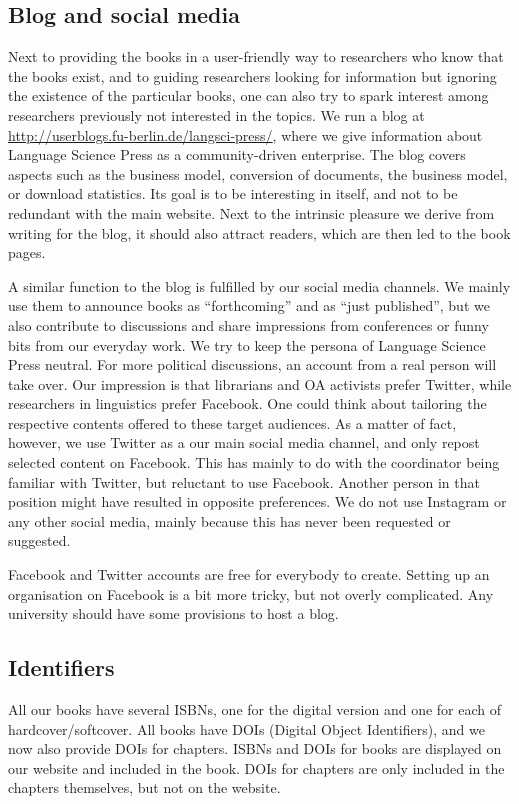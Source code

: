 \documentclass[output=guidelines,guidelines] {langscibook}
\begin{document}
\subsection{Blog and social media}
Next to providing the books in a user-friendly way to researchers who know that the books exist, and to guiding researchers looking for information but ignoring the existence of the particular books, one can also try to spark interest among researchers previously not interested in the topics. We run a blog at \url{http://userblogs.fu-berlin.de/langsci-press/}, where we give information about Language Science Press as a community-driven enterprise. The blog covers aspects such as the business model, conversion of documents, the business model, or download statistics. Its goal is to be interesting in itself, and not to be redundant with the main website. Next to the intrinsic pleasure we derive from writing for the blog, it should also attract readers, which are then led to the book pages.  

A similar function to the blog is fulfilled by our social media channels. We mainly use them to announce books as ``forthcoming'' and as ``just published'', but we also contribute to discussions and share impressions from conferences or funny bits from our everyday work. We try to keep the persona of Language Science Press neutral. For more political discussions, an account from a real person will take over. Our impression is that librarians and OA activists prefer Twitter, while researchers in linguistics prefer Facebook. One could think about tailoring the respective contents offered to these target audiences. As a matter of fact, however, we use Twitter as a our main social media channel, and only repost selected content on Facebook. This has mainly to do with the coordinator being familiar with Twitter, but reluctant to use Facebook. Another person in that position might have resulted in opposite preferences. We do not use Instagram or any other social media, mainly because this has never been requested or suggested.

Facebook and Twitter accounts are free for everybody to create. Setting up an organisation on Facebook is a bit more tricky, but not overly complicated. Any university should have some provisions to host a blog.


\subsection{Identifiers}
All our books have several ISBNs, one for the digital version and one for each of hardcover/softcover. All books have DOIs (Digital Object Identifiers), and we now also provide DOIs for chapters. ISBNs and DOIs for books are displayed on our website and included in the book. DOIs for chapters are only included in the chapters themselves, but not on the website. 
\end{document}
